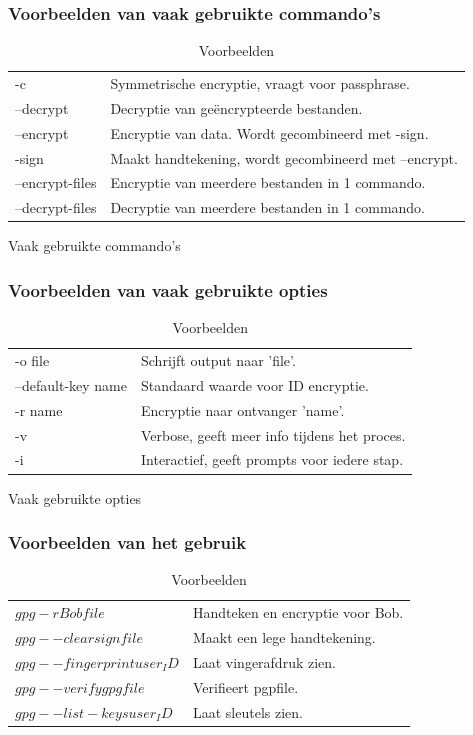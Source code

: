 \documentclass[12pt]{article}
\begin{document}
				\subsubsection{Voorbeelden van vaak gebruikte commando's}\label{com}
					\begin{table}[!ht] \cite{Commando}
						\begin{tabular}{l|l}
								-c				&	Symmetrische encryptie, vraagt voor passphrase\index{Passphrase}.\\
								--decrypt			&	Decryptie\index{Decryptie} van geëncrypteerde bestanden.\\
								--encrypt			&	Encryptie van data. Wordt gecombineerd met -sign.\\
								-sign				&	Maakt handtekening, wordt gecombineerd met --encrypt.\\
								--encrypt-files	&	Encryptie van meerdere bestanden in 1 commando.\\
								--decrypt-files	&	Decryptie van meerdere bestanden in 1 commando.\\
						\end{tabular}
						\caption{Vaak gebruikte commando's}						
					
				\subsubsection{Voorbeelden van vaak gebruikte opties}\label{opt}\cite{Commando}					
						\begin{tabular}{l|l}
								-o file				&	Schrijft output naar 'file'.\\
								--default-key name	&	Standaard waarde voor ID encryptie.\\
								-r name				&	Encryptie naar ontvanger 'name'.\\
								-v					&	Verbose\index{Verbose}, geeft meer info tijdens het proces.\\
								-i					&	Interactief, geeft prompts\index{Prompts} voor iedere stap.\\
						\end{tabular}\caption{Vaak gebruikte opties}
											
				\subsubsection{Voorbeelden van het gebruik}\label{use}\cite{Commando}
						\begin{tabular}{l|l}
								$gpg -r Bob file$				&	Handteken en encryptie voor Bob.\\
								$gpg --clearsign file$			&	Maakt een lege handtekening\index{Handtekening}.\\
								$gpg --fingerprint user_ID$		&	Laat vingerafdruk zien.\\
								$gpg --verify gpgfile$			&	Verifieert pgpfile.\\
								$gpg --list-keys user_ID$		&	Laat sleutels zien.\\
						\end{tabular}
						\caption{Voorbeelden}
					\end{table}	
				\cite{Tabellen}
			
\end{document}
